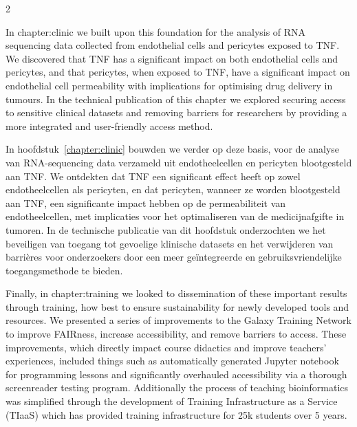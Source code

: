 \documentclass[School=EMC,Draft]{Dissertate}
\begin{document}
\begin{paracol}{2}
\switchcolumn*

In {chapter:clinic} we built upon this foundation for the analysis of RNA sequencing data collected from endothelial cells and pericytes exposed to TNF.
We discovered that TNF has a significant impact on both endothelial cells and pericytes, and that pericytes, when exposed to TNF, have a significant impact on endothelial cell permeability with implications for optimising drug delivery in tumours.
In the technical publication of this chapter we explored securing access to sensitive clinical datasets and removing barriers for researchers by providing a more integrated and user-friendly access method.

\switchcolumn

In hoofdstuk~\ref{chapter:clinic} bouwden we verder op deze basis, voor de analyse van RNA-sequencing data verzameld uit endotheelcellen en pericyten blootgesteld aan TNF.
We ontdekten dat TNF een significant effect heeft op zowel endotheelcellen als pericyten, en dat pericyten, wanneer ze worden blootgesteld aan TNF, een significante impact hebben op de permeabiliteit van endotheelcellen, met implicaties voor het optimaliseren van de medicijnafgifte in tumoren.
In de technische publicatie van dit hoofdstuk onderzochten we het beveiligen van toegang tot gevoelige klinische datasets en het verwijderen van barrières voor onderzoekers door een meer geïntegreerde en gebruiksvriendelijke toegangsmethode te bieden.

\switchcolumn*

Finally, in {chapter:training} we looked to dissemination of these important results through training, how best to ensure sustainability for newly developed tools and resources.
We presented a series of improvements to the Galaxy Training Network to improve FAIRness, increase accessibility, and remove barriers to access.
These improvements, which directly impact course didactics and improve teachers' experiences, included things such as automatically generated Jupyter notebook for programming lessons and significantly overhauled accessibility via a thorough screenreader testing program.
Additionally the process of teaching bioinformatics was simplified through the development of Training Infrastructure as a Service (TIaaS) which has provided training infrastructure for 25k students over 5 years.

\switchcolumn


\end{paracol}
\end{document}
